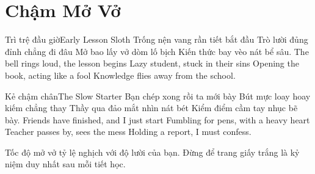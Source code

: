 \chapter{Chậm Mở Vở}

\begin{tutuyetbox}{Trì trệ đầu giờ}{Early Lesson Sloth}
Trống nện vang rần tiết bắt đầu
Trò lười đủng đỉnh chẳng đi đâu
Mở bao lấy vở dòm lố bịch
Kiến thức bay vèo nát bể sâu.
\tcblower
The bell rings loud, the lesson begins 
Lazy student, stuck in their sins 
Opening the book, acting like a fool 
Knowledge flies away from the school.
\end{tutuyetbox}

\begin{tutuyetbox}{Kẻ chậm chân}{The Slow Starter}
Bạn chép xong rồi ta mới bày
Bút mực loay hoay kiếm chẳng thay
Thầy qua đảo mắt nhìn nát bét
Kiểm điểm cầm tay nhục bẽ bày.
\tcblower
Friends have finished, and I just start 
Fumbling for pens, with a heavy heart 
Teacher passes by, sees the mess 
Holding a report, I must confess.
\end{tutuyetbox}

\begin{ghichu}
Tốc độ mở vở tỷ lệ nghịch với độ lười của bạn. Đừng để trang giấy trắng là kỷ niệm duy nhất sau mỗi tiết học.
\end{ghichu}